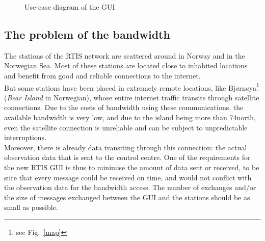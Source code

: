 \documentclass{themeensg}
\begin{document}
\begin{figure}[ht]
	\begin{center}
	\end{center}
	\caption{Use-case diagram of the GUI}
\end{figure}

\subsection{The problem of the bandwidth}

The stations of the RTIS network are scattered around in Norway and in the Norwegian Sea. Most of these stations are located close to inhabited locations and benefit from good and reliable connections to the internet.\\

But some stations have been placed in extremely remote locations, like Bjørnøya\footnote{see Fig.~\ref{map}} (\textit{Bear Island} in Norwegian), whose entire internet traffic transits through satellite connections. Due to the costs of bandwidth using these communications, the available bandwidth is very low, and due to the island being more than 74\degre north, even the satellite connection is unreliable and can be subject to unpredictable interruptions. \\

Moreover, there is already data transiting through this connection: the actual observation data that is sent to the control centre. One of the requirements for the new RTIS GUI is thus to minimise the amount of data sent or received, to be sure that every message could be received on time, and would not conflict with the observation data for the bandwidth access. The number of exchanges and/or the size of messages exchanged between the GUI and the stations should be as small as possible.\\
\end{document}
